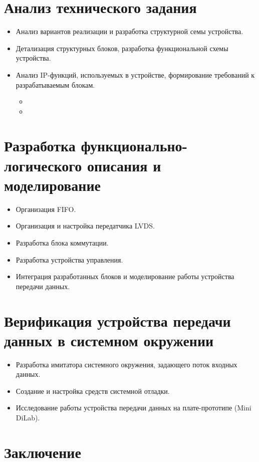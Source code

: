 \section{Анализ технического задания}

\begin{itemize}
	\item Анализ вариантов реализации и разработка структурной семы устройства.
	\item Детализация структурных блоков, разработка функциональной схемы устройства.
	\item Анализ IP-функций, используемых в устройстве, формирование требований к разрабатываемым блокам.
		\begin{itemize}
			\item {}
			\item {}
		\end{itemize}
\end{itemize}

\section{Разработка функционально-логического описания и моделирование}

\begin{itemize}
	\item Организация FIFO.
	\item Организация и настройка передатчика LVDS.
	\item Разработка блока коммутации.
	\item Разработка устройства управления.
	\item Интеграция разработанных блоков и моделирование работы устройства передачи данных.
\end{itemize}

\section{Верификация устройства передачи данных в системном окружении}

\begin{itemize}
	\item Разработка имитатора системного окружения, задающего поток входных данных.
	\item Создание и настройка средств системной отладки.
	\item Исследование работы устройства передачи данных на плате-прототипе (Mini DiLab).
\end{itemize}

\section{Заключение}

